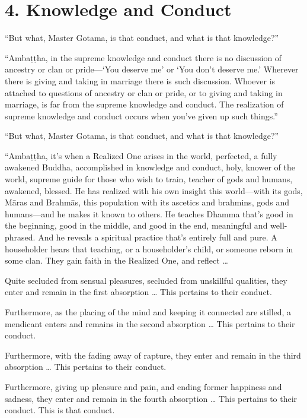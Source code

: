 \documentclass[12pt,openany]{book}%
\begin{document}
\section*{4. Knowledge and Conduct }

“But what, Master Gotama, is that conduct, and what is that knowledge?” 

“\textsanskrit{Ambaṭṭha}, in the supreme knowledge and conduct there is no discussion of ancestry or clan or pride—‘You deserve me’ or ‘You don’t deserve me.’ Wherever there is giving and taking in marriage there is such discussion. Whoever is attached to questions of ancestry or clan or pride, or to giving and taking in marriage, is far from the supreme knowledge and conduct. The realization of supreme knowledge and conduct occurs when you’ve given up such things.” 

“But what, Master Gotama, is that conduct, and what is that knowledge?” 

“\textsanskrit{Ambaṭṭha}, it’s when a Realized One arises in the world, perfected, a fully awakened Buddha, accomplished in knowledge and conduct, holy, knower of the world, supreme guide for those who wish to train, teacher of gods and humans, awakened, blessed. He has realized with his own insight this world—with its gods, \textsanskrit{Māras} and \textsanskrit{Brahmās}, this population with its ascetics and brahmins, gods and humans—and he makes it known to others. He teaches Dhamma that’s good in the beginning, good in the middle, and good in the end, meaningful and well-phrased. And he reveals a spiritual practice that’s entirely full and pure. A householder hears that teaching, or a householder’s child, or someone reborn in some clan. They gain faith in the Realized One, and reflect … 

Quite secluded from sensual pleasures, secluded from unskillful qualities, they enter and remain in the first absorption … This pertains to their conduct. 

Furthermore, as the placing of the mind and keeping it connected are stilled, a mendicant enters and remains in the second absorption … This pertains to their conduct. 

Furthermore, with the fading away of rapture, they enter and remain in the third absorption … This pertains to their conduct. 

Furthermore, giving up pleasure and pain, and ending former happiness and sadness, they enter and remain in the fourth absorption … This pertains to their conduct. This is that conduct. 
\end{document}
